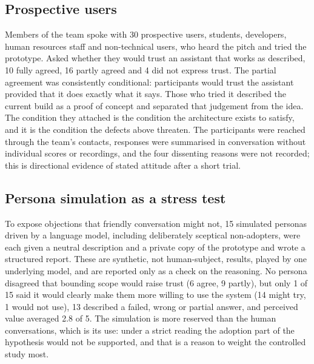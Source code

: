 \subsection{Prospective users}
Members of the team spoke with 30 prospective users, students, developers, human resources staff and non-technical users, who heard the pitch and tried the prototype. Asked whether they would trust an assistant that works as described, 10 fully agreed, 16 partly agreed and 4 did not express trust. The partial agreement was consistently conditional: participants would trust the assistant provided that it does exactly what it says. Those who tried it described the current build as a proof of concept and separated that judgement from the idea. The condition they attached is the condition the architecture exists to satisfy, and it is the condition the defects above threaten. The participants were reached through the team's contacts, responses were summarised in conversation without individual scores or recordings, and the four dissenting reasons were not recorded; this is directional evidence of stated attitude after a short trial.

\subsection{Persona simulation as a stress test}
To expose objections that friendly conversation might not, 15 simulated personas driven by a language model, including deliberately sceptical non-adopters, were each given a neutral description and a private copy of the prototype and wrote a structured report. These are synthetic, not human-subject, results, played by one underlying model, and are reported only as a check on the reasoning. No persona disagreed that bounding scope would raise trust (6 agree, 9 partly), but only 1 of 15 said it would clearly make them more willing to use the system (14 might try, 1 would not use), 13 described a failed, wrong or partial answer, and perceived value averaged 2.8 of 5. The simulation is more reserved than the human conversations, which is its use: under a strict reading the adoption part of the hypothesis would not be supported, and that is a reason to weight the controlled study most.
